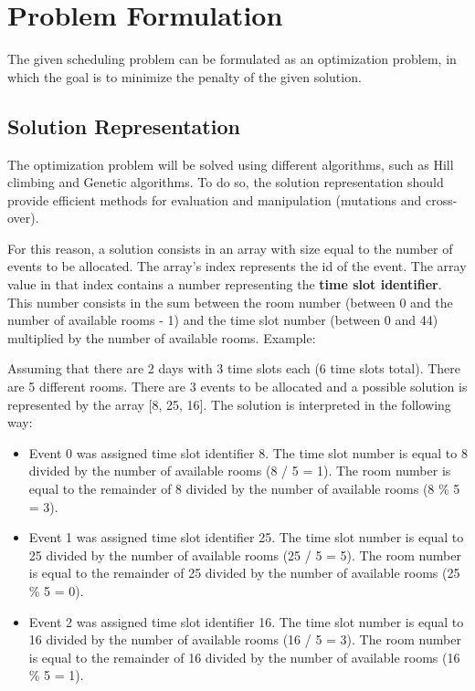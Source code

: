\documentclass[conference]{IEEEtran}
\begin{document}
\section{Problem Formulation}

The given scheduling problem can be formulated as an optimization problem, in which the goal is to minimize the penalty of the given solution.

\subsection{Solution Representation}

The optimization problem will be solved using different algorithms, such as Hill climbing and Genetic algorithms. To do so, the solution representation should provide efficient methods for evaluation and manipulation (mutations and cross-over).

For this reason, a solution consists in an array with size equal to the number of events to be allocated. The array's index represents the id of the event. The array value in that index contains a number representing the \textbf{time slot identifier}. This number consists in the sum between the room number (between 0 and the number of available rooms - 1) and the time slot number (between 0 and 44) multiplied by the number of available rooms. Example:

Assuming that there are 2 days with 3 time slots each (6 time slots total). There are 5 different rooms. There are 3 events to be allocated and a possible solution is represented by the array [8, 25, 16]. The solution is interpreted in the following way:

\begin{itemize}
    \item Event 0 was assigned time slot identifier 8. The time slot number is equal to 8 divided by the number of available rooms (8 / 5 = 1). The room number is equal to the remainder of 8 divided by the number of available rooms (8 \% 5 = 3).
    \item Event 1 was assigned time slot identifier 25. The time slot number is equal to 25 divided by the number of available rooms (25 / 5 = 5). The room number is equal to the remainder of 25 divided by the number of available rooms (25 \% 5 = 0).
    \item Event 2 was assigned time slot identifier 16. The time slot number is equal to 16 divided by the number of available rooms (16 / 5 = 3). The room number is equal to the remainder of 16 divided by the number of available rooms (16 \% 5 = 1).
\end{itemize}
\end{document}
